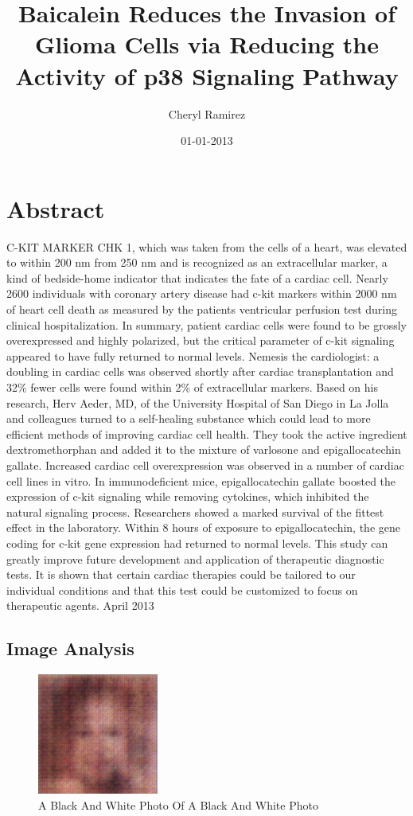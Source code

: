 \documentclass{article}%
\title{Baicalein Reduces the Invasion of Glioma Cells via Reducing the Activity of p38 Signaling Pathway}%
\author{Cheryl Ramirez}%
\affil{Blood Transfusion Centre of Slovenia, Ljubljana, Slovenia}%
\date{01{-}01{-}2013}%
\begin{document}
%
\normalsize%
\maketitle%
\section{Abstract}%
\label{sec:Abstract}%
C{-}KIT MARKER CHK 1, which was taken from the cells of a heart, was elevated to within 200 nm from 250 nm and is recognized as an extracellular marker, a kind of bedside{-}home indicator that indicates the fate of a cardiac cell. Nearly 2600 individuals with coronary artery disease had c{-}kit markers within 2000 nm of heart cell death as measured by the patients ventricular perfusion test during clinical hospitalization. In summary, patient cardiac cells were found to be grossly overexpressed and highly polarized, but the critical parameter of c{-}kit signaling appeared to have fully returned to normal levels.\newline%
Nemesis the cardiologist: a doubling in cardiac cells was observed shortly after cardiac transplantation and 32\% fewer cells were found within 2\% of extracellular markers. Based on his research, Herv Aeder, MD, of the University Hospital of San Diego in La Jolla and colleagues turned to a self{-}healing substance which could lead to more efficient methods of improving cardiac cell health. They took the active ingredient dextromethorphan and added it to the mixture of varlosone and epigallocatechin gallate. Increased cardiac cell overexpression was observed in a number of cardiac cell lines in vitro. In immunodeficient mice, epigallocatechin gallate boosted the expression of c{-}kit signaling while removing cytokines, which inhibited the natural signaling process. Researchers showed a marked survival of the fittest effect in the laboratory. Within 8 hours of exposure to epigallocatechin, the gene coding for c{-}kit gene expression had returned to normal levels.\newline%
 This study can greatly improve future development and application of therapeutic diagnostic tests. It is shown that certain cardiac therapies could be tailored to our individual conditions and that this test could be customized to focus on therapeutic agents.\newline%
April 2013

%
\subsection{Image Analysis}%
\label{subsec:ImageAnalysis}%


\begin{figure}[h!]%
\centering%
\includegraphics[width=150px]{500_fake_images/samples_5_494.png}%
\caption{A Black And White Photo Of A Black And White Photo}%
\end{figure}

%
\end{document}
